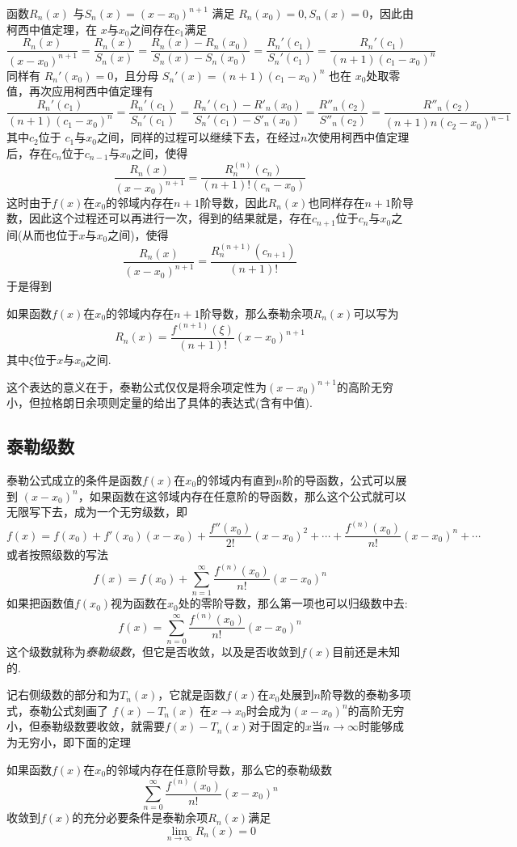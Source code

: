 函数$R_n(x)$ 与$S_n(x)=(x-x_0)^{n+1}$ 满足 $R_n(x_0)=0,S_n(x)=0$，因此由柯西中值定理，在 $x$与$x_0$之间存在$c_1$满足
\[ \frac{R_n(x)}{(x-x_0)^{n+1}} = \frac{R_n(x)}{S_n(x)} = \frac{R_n(x)-R_n(x_0)}{S_n(x)-S_n(x_0)} = \frac{R_n'(c_1)}{S_n'(c_1)} = \frac{R_n'(c_1)}{(n+1)(c_1-x_0)^n} \]
同样有 $R_n'(x_0)=0$，且分母 $S_n'(x)=(n+1)(c_1-x_0)^n$ 也在 $x_0$处取零值，再次应用柯西中值定理有
\[  \frac{R_n'(c_1)}{(n+1)(c_1-x_0)^n} = \frac{R_n'(c_1)}{S_n'(c_1)} =  \frac{R_n'(c_1)-R'_n(x_0)}{S_n'(c_1)-S'_n(x_0)} = \frac{R''_n(c_2)}{S''_n(c_2)} = \frac{R''_{n}(c_2)}{(n+1)n(c_2-x_0)^{n-1}} \]
其中$c_2$位于 $c_1$与$x_0$之间，同样的过程可以继续下去，在经过$n$次使用柯西中值定理后，存在$c_n$位于$c_{n-1}$与$x_0$之间，使得
\[ \frac{R_n(x)}{(x-x_0)^{n+1}} = \frac{R^{(n)}_n(c_n)}{(n+1)!(c_n-x_0)} \]
这时由于$f(x)$在$x_0$的邻域内存在$n+1$阶导数，因此$R_n(x)$也同样存在$n+1$阶导数，因此这个过程还可以再进行一次，得到的结果就是，存在$c_{n+1}$位于$c_n$与$x_0$之间(从而也位于$x$与$x_0$之间)，使得
\[ \frac{R_n(x)}{(x-x_0)^{n+1}} = \frac{R^{(n+1)}_n(c_{n+1})}{(n+1)!} \]
于是得到
\begin{theorem}
  如果函数$f(x)$在$x_0$的邻域内存在$n+1$阶导数，那么泰勒余项$R_n(x)$可以写为
\[ R_n(x) = \frac{f^{(n+1)}(\xi)}{(n+1)!}(x-x_0)^{n+1} \]
其中$\xi$位于$x$与$x_0$之间.
\end{theorem}

这个表达的意义在于，泰勒公式仅仅是将余项定性为$(x-x_0)^{n+1}$的高阶无穷小，但拉格朗日余项则定量的给出了具体的表达式(含有中值).

\subsection{泰勒级数}
\label{sec:taylor-series}

泰勒公式成立的条件是函数$f(x)$在$x_0$的邻域内有直到$n$阶的导函数，公式可以展到 $(x-x_0)^n$，如果函数在这邻域内存在任意阶的导函数，那么这个公式就可以无限写下去，成为一个无穷级数，即
\[ f(x) = f(x_0) + f'(x_0)(x-x_0)+\frac{f''(x_0)}{2!}(x-x_0)^2+\cdots+\frac{f^{(n)}(x_0)}{n!}(x-x_0)^n+\cdots \]
或者按照级数的写法
\[ f(x) = f(x_0) + \sum_{n=1}^{\infty} \frac{f^{(n)}(x_0)}{n!}(x-x_0)^n \]
如果把函数值$f(x_0)$视为函数在$x_0$处的零阶导数，那么第一项也可以归级数中去:
\[ f(x) = \sum_{n=0}^{\infty} \frac{f^{(n)}(x_0)}{n!}(x-x_0)^n \]
这个级数就称为\emph{泰勒级数}，但它是否收敛，以及是否收敛到$f(x)$目前还是未知的.

记右侧级数的部分和为$T_n(x)$，它就是函数$f(x)$在$x_0$处展到$n$阶导数的泰勒多项式，泰勒公式刻画了 $f(x)-T_n(x)$ 在$x\to x_0$时会成为$(x-x_0)^n$的高阶无穷小，但泰勒级数要收敛，就需要$f(x)-T_n(x)$对于固定的$x$当$n\to\infty$时能够成为无穷小，即下面的定理
\begin{theorem}
  如果函数$f(x)$在$x_0$的邻域内存在任意阶导数，那么它的泰勒级数
  \[ \sum_{n=0}^{\infty} \frac{f^{(n)}(x_0)}{n!}(x-x_0)^n \]
  收敛到$f(x)$的充分必要条件是泰勒余项$R_n(x)$满足
  \[ \lim_{n \to \infty} R_n(x) = 0 \]
\end{theorem}

